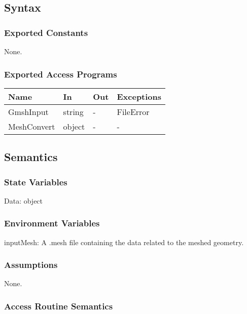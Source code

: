 \documentclass[12pt, titlepage]{article}
\begin{document}
\subsection{Syntax}

\subsubsection{Exported Constants}
None.
\subsubsection{Exported Access Programs}

\begin{center}
	\begin{tabular}{p{4cm} p{2cm} p{2cm} p{2cm}}
		\hline
		\textbf{Name} & \textbf{In} & \textbf{Out} & \textbf{Exceptions} \\
		\hline
		GmshInput & string & - & FileError \\
		MeshConvert & object & - & -\\
		\hline
	\end{tabular}
\end{center}

\subsection{Semantics}

\subsubsection{State Variables}

Data: object

\subsubsection{Environment Variables}
inputMesh: A .mesh file containing the data related to the meshed geometry.

\subsubsection{Assumptions}

None.

\subsubsection{Access Routine Semantics}
\end{document}
